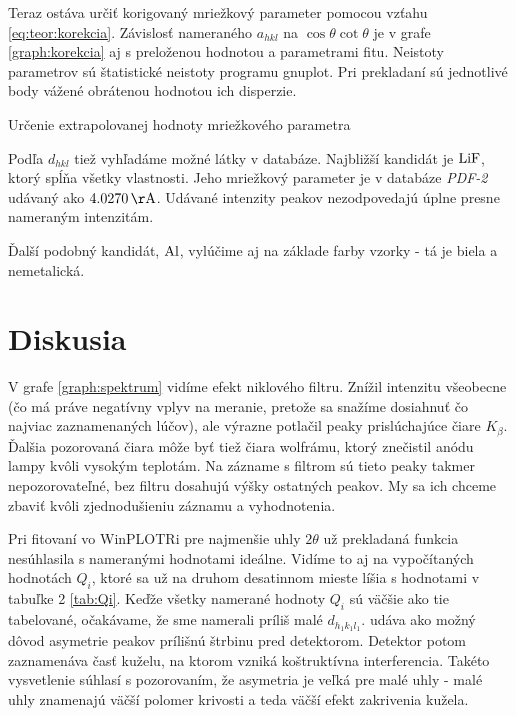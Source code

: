 \documentclass[a4paper, 10pt]{article}
\newcommand{\unit}[1]{\ensuremath{\, \mathrm{#1}}}
\begin{document}
Teraz ostáva určiť korigovaný mriežkový parameter pomocou vzťahu \ref{eq:teor:korekcia}. Závislosť nameraného $a_{hkl}$ na $\cos\theta\cot\theta$ je v grafe \ref{graph:korekcia} aj s preloženou hodnotou a parametrami fitu. Neistoty parametrov sú štatistické neistoty programu gnuplot. Pri prekladaní sú jednotlivé body vážené obrátenou hodnotou ich disperzie.

\begin{graph}[h!]
\centering
\vspace*{-15pt}

\caption{Určenie extrapolovanej hodnoty mriežkového parametra \label{graph:korekcia} }
\end{graph}

Podľa $d_{hkl}$ tiež vyhľadáme možné látky v databáze. Najbližší kandidát je $\ce{LiF}$, ktorý spĺňa všetky vlastnosti. Jeho mriežkový parameter je v databáze {\it PDF-2} udávaný ako $4.0270\unit\AA$. Udávané intenzity peakov nezodpovedajú úplne presne nameraným intenzitám.

Ďalší podobný kandidát, $\ce{Al}$, vylúčime aj na základe farby vzorky - tá je biela a nemetalická.

\section*{Diskusia}
V grafe \ref{graph:spektrum} vidíme efekt niklového filtru. Znížil intenzitu všeobecne (čo má práve negatívny vplyv na meranie, pretože sa snažíme dosiahnuť čo najviac zaznamenaných lúčov), ale výrazne potlačil peaky prislúchajúce čiare $K_\beta$. Ďalšia pozorovaná čiara môže byť tiež čiara wolfrámu, ktorý znečistil anódu lampy kvôli vysokým teplotám. Na zázname s filtrom sú tieto peaky takmer nepozorovateľné, bez filtru dosahujú výšky ostatných peakov. My sa ich chceme zbaviť kvôli zjednodušieniu záznamu a vyhodnotenia.

Pri fitovaní vo WinPLOTRi pre najmenšie uhly $2\theta$ už prekladaná funkcia nesúhlasila s nameranými hodnotami ideálne. Vidíme to aj na vypočítaných hodnotách $Q_i$, ktoré sa už na druhom desatinnom mieste líšia s hodnotami v tabuľke 2 \ref{tab:Qi}. Keďže všetky namerané hodnoty $Q_i$ sú väčšie ako tie tabelované, očakávame, že sme namerali príliš malé $d_{h_1 k_1 l_1}$. \cite{pres} udáva ako možný dôvod asymetrie peakov prílišnú štrbinu pred detektorom. Detektor potom zaznamenáva časť kuželu, na ktorom vzniká koštruktívna interferencia. Takéto vysvetlenie súhlasí s pozorovaním, že asymetria je veľká pre malé uhly - malé uhly znamenajú väčší polomer krivosti a teda väčší efekt zakrivenia kužela.
\end{document}
